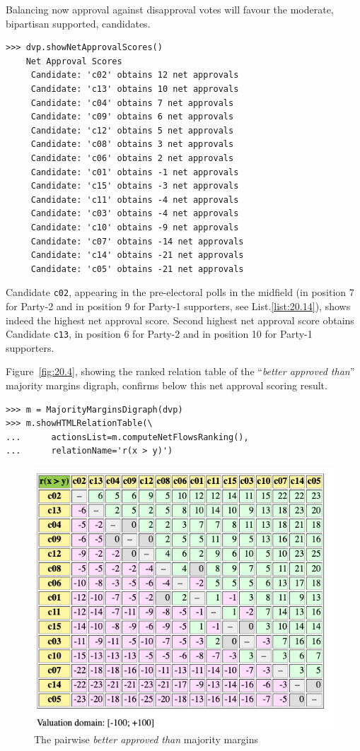 Balancing now approval against disapproval votes will favour the moderate, bipartisan supported, candidates.
\begin{lstlisting}
>>> dvp.showNetApprovalScores()
    Net Approval Scores
     Candidate: 'c02' obtains 12 net approvals
     Candidate: 'c13' obtains 10 net approvals
     Candidate: 'c04' obtains 7 net approvals
     Candidate: 'c09' obtains 6 net approvals
     Candidate: 'c12' obtains 5 net approvals
     Candidate: 'c08' obtains 3 net approvals
     Candidate: 'c06' obtains 2 net approvals
     Candidate: 'c01' obtains -1 net approvals
     Candidate: 'c15' obtains -3 net approvals
     Candidate: 'c11' obtains -4 net approvals
     Candidate: 'c03' obtains -4 net approvals
     Candidate: 'c10' obtains -9 net approvals
     Candidate: 'c07' obtains -14 net approvals
     Candidate: 'c14' obtains -21 net approvals
     Candidate: 'c05' obtains -21 net approvals
\end{lstlisting}

Candidate \texttt{c02}, appearing in the pre-electoral polls in the midfield (in position 7 for Party-2 and in position 9 for Party-1 supporters, see List.\vref{list:20.14}), shows indeed the highest net approval score. Second highest net approval score obtains Candidate \texttt{c13}, in  position 6 for Party-2 and in position 10 for Party-1 supporters.

Figure~\vref{fig:20.4}, showing the \NetFlows ranked relation table of the ``\emph{better approved than}'' majority margins digraph, confirms below this net approval scoring result.
\begin{lstlisting}
>>> m = MajorityMarginsDigraph(dvp)
>>> m.showHTMLRelationTable(\
...      actionsList=m.computeNetFlowsRanking(),
...      relationName='r(x > y)')
\end{lstlisting}	   
\begin{figure}[ht]
\includegraphics[width=0.8\hsize]{Figures/20-4-majMargDAV.png}
\caption{The pairwise \emph{better approved than} majority margins} 
\label{fig:20.4}       %
\end{figure}

